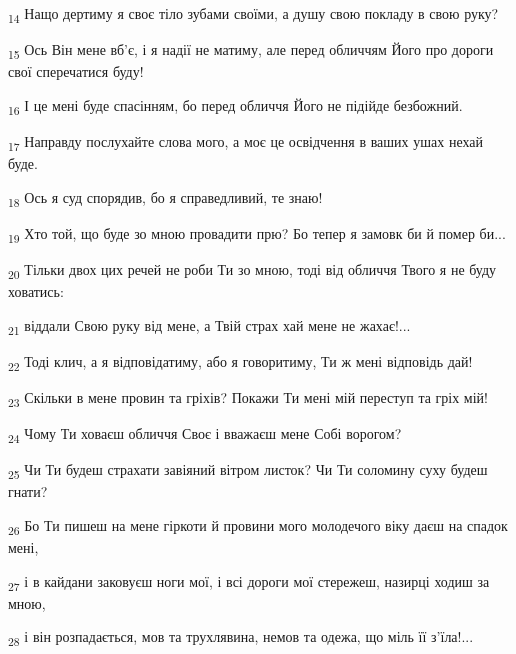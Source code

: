 \begin{tcolorbox}
\textsubscript{14} Нащо дертиму я своє тіло зубами своїми, а душу свою покладу в свою руку?
\end{tcolorbox}
\begin{tcolorbox}
\textsubscript{15} Ось Він мене вб'є, і я надії не матиму, але перед обличчям Його про дороги свої сперечатися буду!
\end{tcolorbox}
\begin{tcolorbox}
\textsubscript{16} І це мені буде спасінням, бо перед обличчя Його не підійде безбожний.
\end{tcolorbox}
\begin{tcolorbox}
\textsubscript{17} Направду послухайте слова мого, а моє це освідчення в ваших ушах нехай буде.
\end{tcolorbox}
\begin{tcolorbox}
\textsubscript{18} Ось я суд спорядив, бо я справедливий, те знаю!
\end{tcolorbox}
\begin{tcolorbox}
\textsubscript{19} Хто той, що буде зо мною провадити прю? Бо тепер я замовк би й помер би...
\end{tcolorbox}
\begin{tcolorbox}
\textsubscript{20} Тільки двох цих речей не роби Ти зо мною, тоді від обличчя Твого я не буду ховатись:
\end{tcolorbox}
\begin{tcolorbox}
\textsubscript{21} віддали Свою руку від мене, а Твій страх хай мене не жахає!...
\end{tcolorbox}
\begin{tcolorbox}
\textsubscript{22} Тоді клич, а я відповідатиму, або я говоритиму, Ти ж мені відповідь дай!
\end{tcolorbox}
\begin{tcolorbox}
\textsubscript{23} Скільки в мене провин та гріхів? Покажи Ти мені мій переступ та гріх мій!
\end{tcolorbox}
\begin{tcolorbox}
\textsubscript{24} Чому Ти ховаєш обличчя Своє і вважаєш мене Собі ворогом?
\end{tcolorbox}
\begin{tcolorbox}
\textsubscript{25} Чи Ти будеш страхати завіяний вітром листок? Чи Ти соломину суху будеш гнати?
\end{tcolorbox}
\begin{tcolorbox}
\textsubscript{26} Бо Ти пишеш на мене гіркоти й провини мого молодечого віку даєш на спадок мені,
\end{tcolorbox}
\begin{tcolorbox}
\textsubscript{27} і в кайдани заковуєш ноги мої, і всі дороги мої стережеш, назирці ходиш за мною,
\end{tcolorbox}
\begin{tcolorbox}
\textsubscript{28} і він розпадається, мов та трухлявина, немов та одежа, що міль її з'їла!...
\end{tcolorbox}
